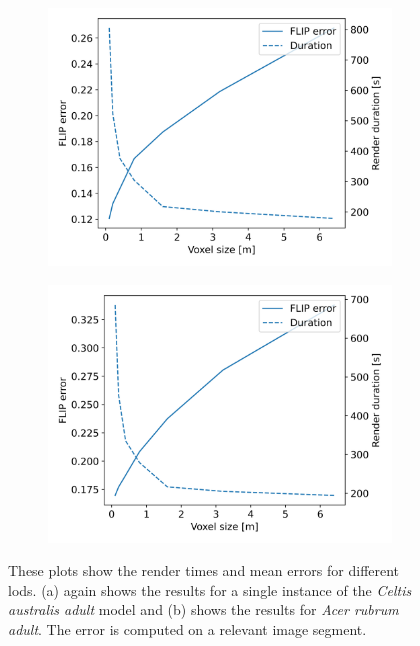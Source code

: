\begin{figure}[ht]
    \centering
    \begin{subfigure}[b]{0.49\linewidth}
        \centering
        \includegraphics[width=1\linewidth]{img/results/performance_quality_EU06a.png}
        \caption{}
    \end{subfigure}
    \begin{subfigure}[b]{0.49\linewidth}
        \centering
        \includegraphics[width=1\linewidth]{img/results/performance_quality_EA01a.png}
        \caption{}
    \end{subfigure}
	\caption[Plots of \FLIP error and rendertimes for different \acsp{lod}]{These plots show the render times and mean \FLIP errors for different \acsp{lod}. (a) again shows the results for a single instance of the \textit{Celtis australis adult} model and (b) shows the results for \textit{Acer rubrum adult}. The \FLIP error is computed on a relevant image segment.}
	\label{fig:performance_quality}
\end{figure}
